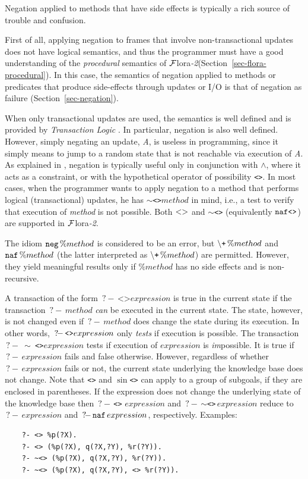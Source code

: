\documentclass[11pt]{article}
\newcommand{\query}{\mbox{$\, ?\! - \, $}}                  %
\newcommand{\FLORA}{{\mbox{\sc ${\cal F}${lora}\rm\emph{-2}}}\xspace}
\newcommand{\PLGNAF}{\mbox{\tt \ensuremath{\tt\backslash}+}\xspace}
\newcommand{\RULELOGNAF}{{{\tt naf}}\xspace}
\begin{document}
Negation applied to methods that have side effects is typically a rich source
of trouble and confusion.

First of all, applying negation to frames that involve
non-transactional updates does not have logical semantics, and thus the
programmer must have a good understanding of the \emph{procedural} semantics of
\FLORA (Section~\ref{sec-flora-procedural}).
In this case, the semantics of negation applied to methods or predicates that produce
side-effects through updates  or I/O is that of negation as failure
(Section~\ref{sec-negation}).

When only transactional updates are used, the semantics is well defined and
is provided by \emph{Transaction Logic}
\cite{trans-chapter-98,trans-tcs94}. In particular, negation is also well
defined. However, simply negating an update, \emph{A}, is useless in
programming, since it simply means to jump to a random state that is not
reachable via execution of \emph{A}.  As explained in
\cite{trans-chapter-98,trans-tcs94}, negation is typically useful only in conjunction
with $\wedge$, where it acts as a constraint, or with the hypothetical
operator of possibility \texttt{<>}.  In most cases, when the programmer
wants to apply negation to a method that performs logical (transactional)
updates, he has \texttt{$\sim$<>}$method$  in mind, i.e., a test to
verify that execution of \emph{method}  is not possible.
Both $\tt<>$ and \texttt{$\sim$<>} (equivalently $\tt\RULELOGNAF \texttt{<>}$) are supported in \FLORA.

The idiom ${\tt neg}\,\%method$ is considered to be an error, but
$\PLGNAF\,\%method$ and $\RULELOGNAF\,\%method$ (the latter interpreted as
$\PLGNAF\,\%method$) are permitted. However, they yield meaningful results only
if $\%method$ has no side effects and is non-recursive.

A transaction of the form $\query \texttt{<>} expression$ is true in the current
state if the transaction $\query method$ \emph{can} be executed in the current
state. The state, however, is not changed even if  $\query method$
does change the state during its execution. In other words, $\texttt{\query <>}
expression$ only \emph{tests} if execution is possible.
The transaction \texttt{\query} \texttt{$\sim$ <>}$expression$ tests if execution of
$expression$ is \emph{im}possible. It is true if $\query expression$ fails
and false otherwise. However, regardless of whether $\query expression$
fails or not, the current state underlying the knowledge base does not
change.
Note that \texttt{<>} and \texttt{$\sin$<>} can apply to a group of
subgoals, if they are enclosed in parentheses.  If the expression does not
change the underlying state of the knowledge base then
\texttt{\query <>} $expression$ and \query\texttt{$\sim$<>}\,$expression$ reduce to
$\query expression$ and $\query \RULELOGNAF\,expression$, respectively.
Examples:
\begin{verbatim}
    ?- <> %p(?X).
    ?- <> (%p(?X), q(?X,?Y), %r(?Y)).
    ?- ~<> (%p(?X), q(?X,?Y), %r(?Y)).
    ?- ~<> (%p(?X), q(?X,?Y), <> %r(?Y)).
\end{verbatim}
\end{document}
